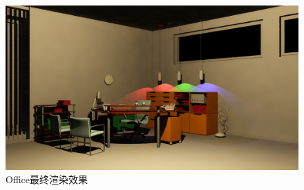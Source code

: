 \documentclass[UTF8]{ctexart}
\begin{document}
        \begin{figure}[H]
            \centering
            \includegraphics[width=16cm]{pic/office.png}
            \caption{Office最终渲染效果}
            \label{fig:10}
        \end{figure}
\end{document}
